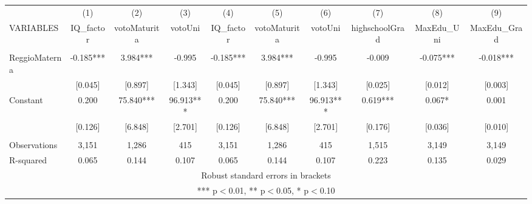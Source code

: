 \begin{tabular}{lccccccccc} \hline
 & (1) & (2) & (3) & (4) & (5) & (6) & (7) & (8) & (9) \\
VARIABLES & IQ\_factor & votoMaturita & votoUni & IQ\_factor & votoMaturita & votoUni & highschoolGrad & MaxEdu\_Uni & MaxEdu\_Grad \\ \hline
 &  &  &  &  &  &  &  &  &  \\
ReggioMaterna & -0.185*** & 3.984*** & -0.995 & -0.185*** & 3.984*** & -0.995 & -0.009 & -0.075*** & -0.018*** \\
 & [0.045] & [0.897] & [1.343] & [0.045] & [0.897] & [1.343] & [0.025] & [0.012] & [0.003] \\
Constant & 0.200 & 75.840*** & 96.913*** & 0.200 & 75.840*** & 96.913*** & 0.619*** & 0.067* & 0.001 \\
 & [0.126] & [6.848] & [2.701] & [0.126] & [6.848] & [2.701] & [0.176] & [0.036] & [0.010] \\
 &  &  &  &  &  &  &  &  &  \\
Observations & 3,151 & 1,286 & 415 & 3,151 & 1,286 & 415 & 1,515 & 3,149 & 3,149 \\
 R-squared & 0.065 & 0.144 & 0.107 & 0.065 & 0.144 & 0.107 & 0.223 & 0.135 & 0.029 \\ \hline
\multicolumn{10}{c}{ Robust standard errors in brackets} \\
\multicolumn{10}{c}{ *** p$<$0.01, ** p$<$0.05, * p$<$0.10} \\
\end{tabular}
